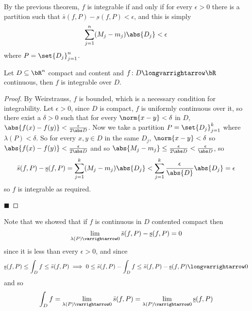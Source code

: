 \documentclass[10pt]{article}
\begin{document}


\bigskip

By the previous theorem, $f$ is integrable if and only if for every $\epsilon>0$ there is a
partition such that $\bar s(f,P) - \underbar s(f,P) < \epsilon$, and this is simply 
\[ \sum_{j=1}^n(M_j-m_j)\abs{D_j} < \epsilon \]
where $P=\set{D_j}_{j=1}^n$.

\begin{thrm*}

    Let $D\subseteq\bR^n$ compact and content and $f\colon D\longvarrightarrow\bR$ continuous, then
    $f$ is integrable over $D$.

\end{thrm*}

\begin{proof}

    By Weirstrauss, $f$ is bounded, which is a necessary condition for integrability.
    Let $\epsilon>0$, since $D$ is compact, $f$ is uniformly continuous over it, so there exist a
    $\delta>0$ such that for every $\norm{x-y}<\delta$ in $D$,
    $\abs{f(x)-f(y)}<\frac{\epsilon}{2\abs D}$.
    Now we take a partition $P=\set{D_j}_{j=1}^k$ where $\lambda(P)<\delta$.
    So for every $x,y\in D$ in the same $D_j$, $\norm{x-y}<\delta$ so
    $\abs{f(x)-f(y)}<\frac\epsilon{2\abs D}$ and so
    $\abs{M_j-m_j}\leq\frac\epsilon{2\abs D}<\frac\epsilon{\abs D}$, so
    \[ \bar s(f,P) - \underbar s(f,P) = \sum_{j=1}^k(M_j-m_j)\abs{D_j} <
    \sum_{j=1}^k\frac\epsilon{\abs{D}}\abs{D_j} = \epsilon \]
    so $f$ is integrable as required.

    \hfill$\blacksquare$

\end{proof}

Note that we showed that if $f$ is continuous in $D$ contented compact then
\[ \lim_{\lambda(P)\varrightarrow0}\bar s(f,P)-\underbar s(f,P) = 0 \]
since it is less than every $\epsilon>0$, and since
\[ \underbar s(f,P) \leq \int_D f \leq \bar s(f,P) \implies
0\leq\bar s(f,P) - \int_D f \leq \bar s(f,P) - \underbar s(f,P) \longvarrightarrow 0 \]
and so
\[ \int_D f = \lim_{\lambda(P)\varrightarrow0}\bar s(f,P) =
\lim_{\lambda(P)\varrightarrow0}\underbar s(f,P) \]
\end{document}
